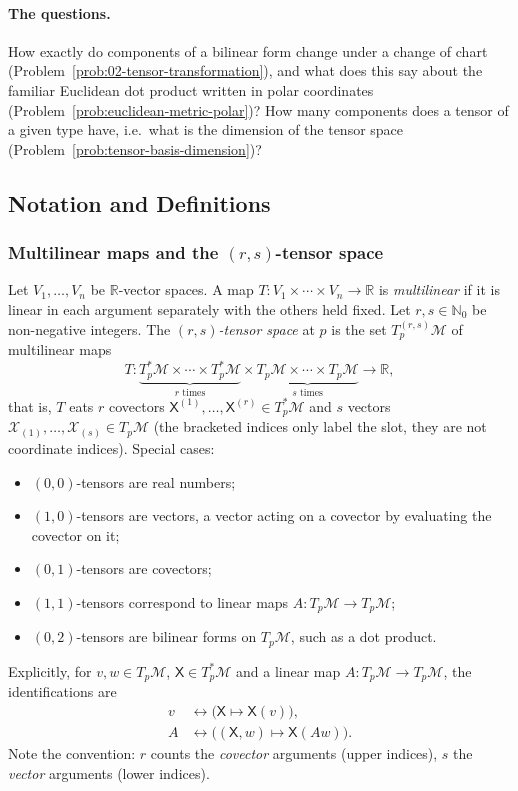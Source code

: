 \documentclass[11pt]{article}
\newcommand{\TpM}{T_p\mathcal M}
\newcommand{\TpsM}{T_p^*\mathcal M}
\newcommand{\TprsM}{T_p^{(r,s)}\mathcal M}
\begin{document}
\paragraph{The questions.}
How exactly do components of a bilinear form change under a change of chart (Problem~\ref{prob:02-tensor-transformation}), and what does this say about the familiar Euclidean dot product written in polar coordinates (Problem~\ref{prob:euclidean-metric-polar})? How many components does a tensor of a given type have, i.e.\ what is the dimension of the tensor space (Problem~\ref{prob:tensor-basis-dimension})?

\subsection*{Notation and Definitions}

\subsubsection*{Multilinear maps and the $(r,s)$-tensor space}
Let $V_1,\dots,V_n$ be $\mathbb R$-vector spaces. A map $T:V_1\times\cdots\times V_n\to\mathbb R$ is \emph{multilinear} if it is linear in each argument separately with the others held fixed. Let $r,s\in\mathbb N_0$ be non-negative integers. The \emph{$(r,s)$-tensor space} at $p$ is the set $\TprsM$ of multilinear maps
\[
T:\underbrace{\TpsM\times\cdots\times\TpsM}_{r\text{ times}}\times\underbrace{\TpM\times\cdots\times\TpM}_{s\text{ times}}\longrightarrow\mathbb R,
\]
that is, $T$ eats $r$ covectors $\mathsf X^{(1)},\dots,\mathsf X^{(r)}\in\TpsM$ and $s$ vectors $\mathcal X_{(1)},\dots,\mathcal X_{(s)}\in\TpM$ (the bracketed indices only label the slot, they are not coordinate indices). Special cases:
\begin{itemize}
  \item $(0,0)$-tensors are real numbers;
  \item $(1,0)$-tensors are vectors, a vector acting on a covector by evaluating the covector on it;
  \item $(0,1)$-tensors are covectors;
  \item $(1,1)$-tensors correspond to linear maps $A:\TpM\to\TpM$;
  \item $(0,2)$-tensors are bilinear forms on $\TpM$, such as a dot product.
\end{itemize}
Explicitly, for $v,w\in\TpM$, $\mathsf X\in\TpsM$ and a linear map $A:\TpM\to\TpM$, the identifications are
\begin{align*}
v&\longleftrightarrow\big(\mathsf X\mapsto\mathsf X(v)\big),\\
A&\longleftrightarrow\big((\mathsf X,w)\mapsto\mathsf X(Aw)\big).
\end{align*}
Note the convention: $r$ counts the \emph{covector} arguments (upper indices), $s$ the \emph{vector} arguments (lower indices).
\end{document}
